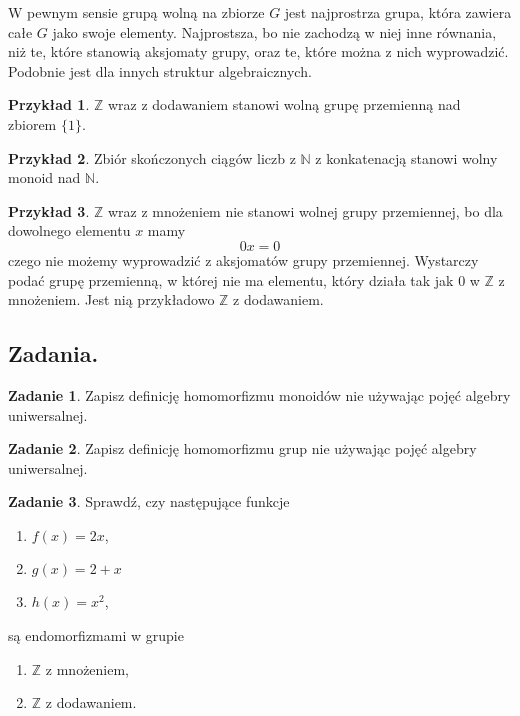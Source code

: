 \documentclass{article}
\theoremstyle{definition}
\newtheorem{example}{Przykład}[section]
\newtheorem{exercise}{Zadanie}[section]
\begin{document}
W pewnym sensie grupą wolną na zbiorze $G$ jest najprostrza grupa,
	która zawiera całe $G$ jako swoje elementy.
Najprostsza,
	bo nie zachodzą w niej inne równania,
	niż te,
	które stanowią aksjomaty grupy,
	oraz te,
	które można z nich wyprowadzić.
Podobnie jest dla innych struktur algebraicznych.

\begin{example}
	$\mathbb{Z}$ wraz z dodawaniem stanowi wolną grupę przemienną nad zbiorem $\{1\}$.
\end{example}

\begin{example}
	Zbiór skończonych ciągów liczb z $\mathbb{N}$ z konkatenacją stanowi wolny monoid nad $\mathbb{N}$.
\end{example}

\begin{example}
	$\mathbb{Z}$ wraz z mnożeniem nie stanowi wolnej grupy przemiennej,
		bo dla dowolnego elementu $x$ mamy
		\begin{equation}
		0x = 0
		\end{equation}
		czego nie możemy wyprowadzić z aksjomatów grupy przemiennej.
	Wystarczy podać grupę przemienną,
		w której nie ma elementu,
		który działa tak jak $0$ w $\mathbb{Z}$ z mnożeniem.
	Jest nią przykładowo $\mathbb{Z}$ z dodawaniem.
\end{example}

\subsection{Zadania.}

\begin{exercise}
	Zapisz definicję homomorfizmu monoidów nie używając pojęć algebry uniwersalnej.
\end{exercise}

\begin{exercise}
	Zapisz definicję homomorfizmu grup nie używając pojęć algebry uniwersalnej.
\end{exercise}

\begin{exercise}
	Sprawdź, czy następujące funkcje
	\begin{enumerate}
		\item $f(x) = 2x$,
		\item $g(x) = 2 + x$
		\item $h(x) = x^2$,
	\end{enumerate}
	są endomorfizmami w grupie
	\begin{enumerate}
		\item $\mathbb{Z}$ z mnożeniem,
		\item $\mathbb{Z}$ z dodawaniem.
	\end{enumerate}
\end{exercise}
\end{document}
